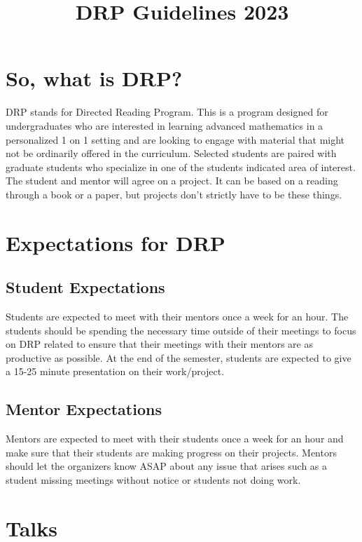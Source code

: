 \documentclass{article}
\begin{document}
\title{DRP Guidelines 2023}

\maketitle

\section{So, what is DRP?}

DRP stands for Directed Reading Program. This is a program designed for undergraduates who are
interested in learning advanced mathematics in a personalized 1 on 1 setting and are looking to
engage with material that might not be ordinarily offered in the curriculum. Selected students are
paired with graduate students who specialize in one of the students indicated area of interest. The
student and mentor will agree on a project. It can be based on a reading through a book or a paper,
but projects don't strictly have to be these things. 

\section{Expectations for DRP}

\subsection{Student Expectations}

Students are expected to meet with their mentors once a week for an hour. The students should be
spending the necessary time outside of their meetings to focus on DRP related to ensure that their
meetings with their mentors are as productive as possible. At the end of the semester, students are
expected to give a 15-25 minute presentation on their work/project. 


\subsection{Mentor Expectations}

Mentors are expected to meet with their students once a week for an hour and make sure that their
students are making progress on their projects. Mentors should let the organizers know ASAP about
any issue that arises such as a student missing meetings without notice or students not doing work.  

\section{Talks}
\end{document}
